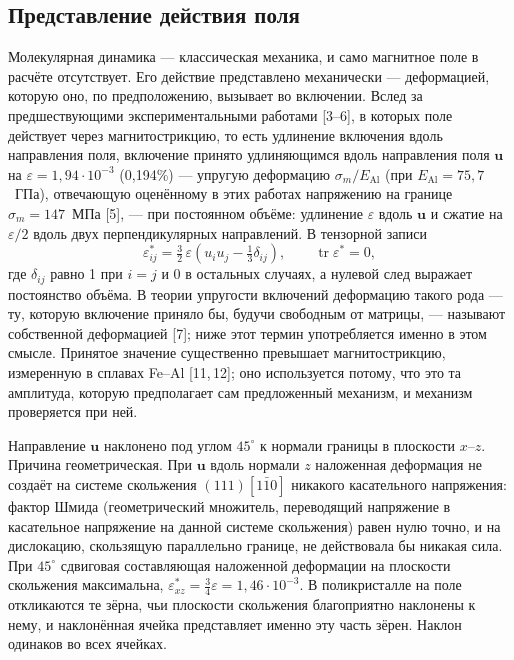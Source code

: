 \subsection{Представление действия поля}

Молекулярная динамика --- классическая механика, и само магнитное поле в
расчёте отсутствует. Его действие представлено механически --- деформацией,
которую оно, по предположению, вызывает во включении. Вслед за
предшествующими экспериментальными работами [3--6], в которых поле действует
через магнитострикцию, то есть удлинение включения вдоль направления поля,
включение принято удлиняющимся вдоль направления поля $\mathbf{u}$ на
$\varepsilon = 1{,}94\cdot10^{-3}$ (0{,}194\%) --- упругую деформацию
$\sigma_m/E_{\mathrm{Al}}$ (при $E_{\mathrm{Al}} = 75{,}7$~ГПа), отвечающую оценённому в этих работах напряжению
на границе $\sigma_m = 147$~МПа [5], --- при постоянном объёме: удлинение
$\varepsilon$ вдоль $\mathbf{u}$ и сжатие на $\varepsilon/2$ вдоль двух
перпендикулярных направлений. В тензорной записи
\begin{equation}
\varepsilon^{*}_{ij}
  = \tfrac{3}{2}\,\varepsilon\!\left(u_i u_j - \tfrac{1}{3}\delta_{ij}\right),
\qquad \operatorname{tr}\varepsilon^{*} = 0,
\end{equation}
где $\delta_{ij}$ равно 1 при $i = j$ и 0 в остальных случаях, а нулевой след
выражает постоянство объёма. В теории упругости включений деформацию такого
рода --- ту, которую включение приняло бы, будучи свободным от матрицы, ---
называют собственной деформацией [7]; ниже этот термин употребляется именно в
этом смысле. Принятое значение существенно превышает магнитострикцию,
измеренную в сплавах Fe--Al [11,\,12]; оно используется потому, что это та
амплитуда, которую предполагает сам предложенный механизм, и механизм
проверяется при ней.

Направление $\mathbf{u}$ наклонено под углом $45^{\circ}$ к нормали границы
в плоскости $x$--$z$. Причина геометрическая. При $\mathbf{u}$ вдоль нормали
$z$ наложенная деформация не создаёт на системе скольжения $(111)[1\bar{1}0]$
никакого касательного напряжения: фактор Шмида (геометрический множитель,
переводящий напряжение в касательное напряжение на данной системе скольжения)
равен нулю точно, и на дислокацию, скользящую параллельно границе, не
действовала бы никакая сила. При $45^{\circ}$ сдвиговая составляющая
наложенной деформации на плоскости скольжения максимальна,
$\varepsilon^{*}_{xz} = \tfrac{3}{4}\varepsilon = 1{,}46\cdot10^{-3}$. В
поликристалле на поле откликаются те зёрна, чьи плоскости скольжения
благоприятно наклонены к нему, и наклонённая ячейка представляет именно эту
часть зёрен. Наклон одинаков во всех ячейках.

